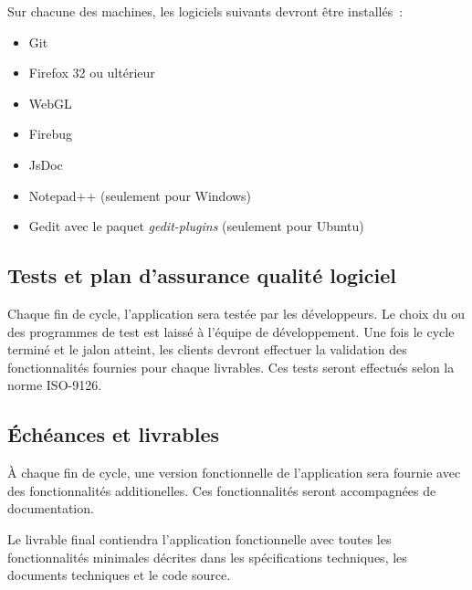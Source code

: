 \documentclass{scrartcl}
\begin{document}
		Sur chacune des machines, les logiciels suivants devront être installés~:
		\medskip
		
		\begin{itemize}
			\item Git
			\item Firefox 32 ou ultérieur
			\item WebGL
			\item Firebug
			\item JsDoc
			\item Notepad++ (seulement pour Windows)
			\item Gedit avec le paquet \emph{gedit-plugins} (seulement pour Ubuntu)
		\end{itemize}



	\subsection{Tests et plan d'assurance qualité logiciel}
		Chaque fin de cycle, l'application sera testée par les développeurs. Le choix du ou des programmes de test est laissé à l'équipe de développement. Une fois le cycle terminé et le jalon atteint, les clients devront effectuer la validation des fonctionnalités fournies pour chaque livrables. Ces tests seront effectués selon la norme ISO-9126.

			
\newpage
	\subsection{Échéances et livrables}
		\`A chaque fin de cycle, une version fonctionnelle de l'application sera fournie avec des fonctionnalités additionelles. Ces fonctionnalités seront accompagnées de documentation.
		
		Le livrable final contiendra l'application fonctionnelle avec toutes les fonctionnalités minimales décrites dans les spécifications techniques, les documents techniques et le code source.
		
\end{document}
